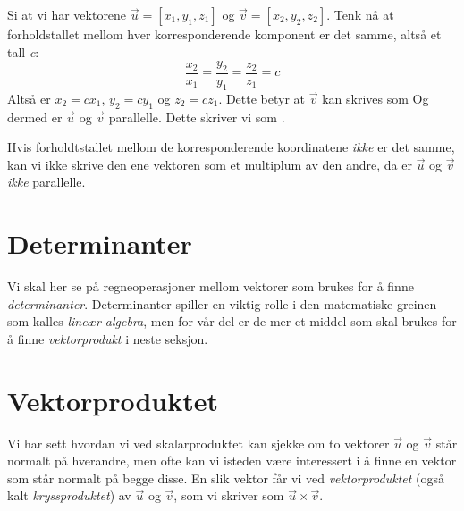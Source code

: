 Si at vi har vektorene $ {\vec{u}=[x_1, y_1, z_1]} $ og $ {\vec{v}=[x_2, y_2, z_2]} $. Tenk nå at forholdstallet mellom hver korresponderende komponent er det samme, altså et tall \textit{c}:
\[ \frac{x_2}{x_1}=\frac{y_2}{y_1}=\frac{z_2}{z_1}=c \] \newpage
Altså er $ {x_2=cx_1} $, $ {y_2=cy_1} $ og $ {z_2=cz_1} $. Dette betyr at $ \vec{v} $ kan skrives som\vs
{}
Og dermed er $ \vec{u} $ og $ \vec{v} $ parallelle. Dette skriver vi som . \vsk

Hvis forholdtstallet mellom de korresponderende koordinatene \textit{ikke} er det samme, kan vi ikke skrive den ene vektoren som et multiplum av den andre, da er $ \vec{u} $ og $ \vec{v} $ \textsl{ikke} parallelle. \regv
\para
\parae
{}

\section{Determinanter} 
Vi skal her se på regneoperasjoner mellom vektorer som brukes for å finne \textit{determinanter}. Determinanter spiller en viktig rolle i den matematiske greinen som kalles \textit{lineær algebra}, men for vår del er de mer et middel som skal brukes for å finne \textit{vektorprodukt} i neste seksjon.\regv
\detto
\newpage
{}
\dettre
\dettree
\section{Vektorproduktet}
Vi har sett hvordan vi ved skalarproduktet kan sjekke om to vektorer $ \vec{u} $ og $ \vec{v} $ står normalt på hverandre, men ofte kan vi isteden være interessert i å finne en vektor som står normalt på begge disse. En slik vektor får vi ved \textit{vektorproduktet} (også kalt \textit{kryssproduktet}) av $ \vec{u} $ og $ \vec{v} $, som vi skriver som $ {\vec{u}\times\vec{v}} $.
\vsk

